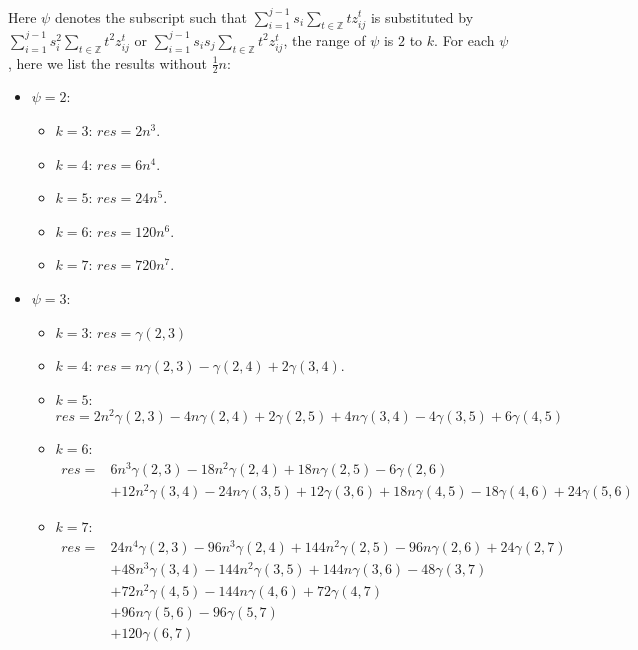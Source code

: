 \documentclass{article}
\begin{document}
Here $\psi$ denotes the subscript such that $\sum_{i=1}^{j-1} s_i\sum_{t\in\mathbb{Z}}tz_{ij}^t$ is substituted by $\sum_{i=1}^{j-1} s_i^2\sum_{t\in\mathbb{Z}}t^2z_{ij}^t$ or  $\sum_{i=1}^{j-1} s_is_j\sum_{t\in\mathbb{Z}}t^2z_{ij}^t$, the range of $\psi$ is $2$ to $k$. For each $\psi$, here we list the results without $\frac12 n$:

\begin{itemize}
    \item $\psi = 2$:
    \begin{itemize}[label=$\circ$]  %
        \item $k=3$: $res = 2n^3.$
        \item $k=4$: $res = 6n^4.$
        \item $k=5$: $res = 24n^5.$
        \item $k=6$: $res = 120n^6.$
        \item $k=7$: $res = 720n^7.$
    \end{itemize}

    \item $\psi = 3$:
    \begin{itemize}[label=$\circ$]
    	\item $k=3$: $res = \gamma(2,3)$
        \item $k=4$:
        $
        res = n\gamma(2,3) - \gamma(2,4) + 2\gamma(3,4).
        $
        
        \item $k=5$:
        \[
        res = 2n^2\gamma(2,3) - 4n\gamma(2,4) + 2\gamma(2,5)+ 4n\gamma(3,4) -4\gamma(3,5) + 6\gamma(4,5)
        \]
        
        \item $k=6$:
        \[
        \begin{aligned}
        res = &6n^3\gamma(2,3) - 18n^2\gamma(2,4) + 18n\gamma(2,5) -6\gamma(2,6)\\
        &+12n^2\gamma(3,4) - 24n\gamma(3,5) + 12\gamma(3,6)+ 18n\gamma(4,5) -18\gamma(4,6) + 24\gamma(5,6)
        \end{aligned}
        \]
        
        \item $k=7$:
        \[
        \begin{aligned}
        res = &24n^4\gamma(2,3) - 96n^3\gamma(2,4) + 144n^2\gamma(2,5) - 96n\gamma(2,6) + 24\gamma(2,7)\\
        &+ 48n^3\gamma(3,4) - 144n^2\gamma(3,5) + 144n\gamma(3,6) - 48\gamma(3,7)\\
        &+ 72n^2\gamma(4,5) -144n\gamma(4,6) + 72\gamma(4,7)\\
        & + 96n\gamma(5,6) -96\gamma(5,7)\\
        & +120\gamma(6,7)
        \end{aligned}
        \]
    \end{itemize}


\end{itemize}
\end{document}
